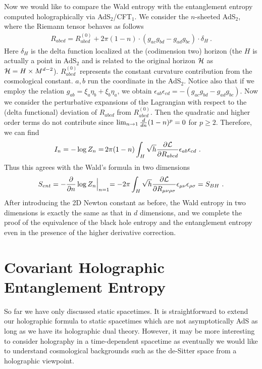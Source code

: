 \documentclass[12pt]{article}
\def\ep{{\epsilon}}
\def\frac#1#2{{#1\over #2}}
\def\s{\sqrt}
\def\de{\partial}
\def\f {\frac}
\def\no{\nonumber \\}
\def\ep{\epsilon}
\def\ep{{\epsilon}}
\def\frac#1#2{{#1\over #2}}
\def\s{\sqrt}
\begin{document}
Now we would like to compare the Wald entropy with the entanglement
entropy computed holographically via AdS$_2$/CFT$_1$. We consider
the $n$-sheeted AdS$_2$, where the
Riemann tensor behaves as follows \cite{FursaevR}
\begin{align}
R_{abcd}=R_{abcd}^{(0)}+2\pi(1-n)\cdot
(g_{ac}g_{bd}-g_{ad}g_{bc})\cdot \delta_H\ .
\end{align}
Here $\delta_H$ is the delta function localized at the (codimension two)
horizon (the $H$ is actually a point in AdS$_2$ and is related to the
original horizon $\cal H$ as ${\cal H} = H \times M^{d-2}$).
$R_{abcd}^{(0)}$ represents the constant curvature contribution from
the cosmological constant. $a,b$ run the coordinate in the AdS$_2$.
Notice also that if we employ the relation
$g_{ab}=\xi_a\eta_b+\xi_b\eta_a$, we obtain
$\ep_{ab}\ep_{cd}=-(g_{ac}g_{bd}-g_{ad}g_{bc})$.
Now we consider the perturbative expansions of the Lagrangian with
respect to the (delta functional) deviation of $R_{abcd}$ from
$R_{abcd}^{(0)}$. Then the quadratic and higher order terms do not
contribute since $\lim_{n\to 1}\f{d}{dn}(1-n)^p=0$ for $p\geq 2$.
Therefore, we can find
\begin{align}
 I_n=-\log Z_n%
 =& \, 2\pi (1-n)\int_{H} \s{h}\f{\de {\cal{L}}}{\de
R_{abcd}}\ep_{ab}\ep_{cd} \ .
\end{align}
Thus this agrees with the Wald's formula in two dimensions
\begin{align}
S_{ent}=-\f{\de}{\de n}\log Z_n\Bigl |_{n=1}=-2\pi\int_{H}\s{h}\f{\de
{\cal{L}}}{\de R_{\mu\nu\rho\sigma}}\ep_{\mu\nu}\ep_{\rho\sigma}=S_{BH} \ .
\end{align}
After introducing the 2D Newton constant as before, the Wald entropy in
two dimensions is exactly the same as that in $d$ dimensions, and we
complete the proof of the equivalence of the black hole entropy and
the entanglement entropy even in the presence of the higher derivative
correction.


\section{Covariant Holographic Entanglement Entropy}\label{seccov}
\setcounter{equation}{0}
\hspace{5mm}
So far we have only discussed static spacetimes. It is straightforward to
extend our holographic formula to static spacetimes which are not asymptotically
AdS as long as we have its holographic dual theory.
However, it may be
more interesting to consider holography in a time-dependent
spacetime as eventually we would like to understand cosmological
backgrounds such as the de-Sitter space from a holographic
viewpoint.
\end{document}
